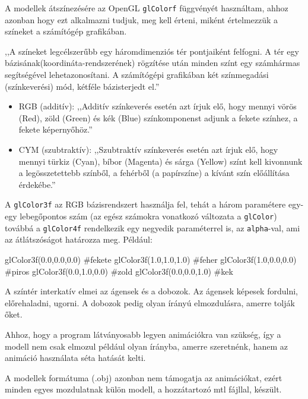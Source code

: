 
A modellek átszínezésére az OpenGL \texttt{glColorf} függvényét használtam, ahhoz azonban hogy ezt alkalmazni tudjuk, meg kell érteni, miként értelmezzük a színeket a számítógép grafikában.

,,A színeket legcélszerűbb egy háromdimenziós tér pontjaiként felfogni. A tér egy bázisának(koordináta-rendszerének) rögzítése után minden színt egy számhármas segítségével lehetazonosítani. A számítógépi grafikában két színmegadási (színkeverési) mód, kétféle bázisterjedt el.”
\begin{itemize}
\item  RGB (additív): ,,Additív színkeverés esetén azt írjuk elő, hogy mennyi vörös (Red), zöld (Green) és kék (Blue) színkomponenst adjunk a fekete színhez, a fekete képernyőhöz.”
\item CYM (szubtraktív): ,,Szubtraktív színkeverés esetén azt írjuk elő, hogy mennyi türkiz (Cyan), bíbor (Magenta) és sárga (Yellow) színt kell kivonnunk a legösszetettebb színből, a fehérből (a papírszíne) a kívánt szín előállítása érdekébe.”
\end{itemize}

A \texttt{glColor3f} az RGB bázisrendszert használja fel, tehát a három paramétere egy-egy lebegőpontos szám (az egész számokra vonatkozó változata a \texttt{glColor}) továbbá a \texttt{glColor4f} rendelkezik egy negyedik paraméterrel is, az \texttt{alpha}-val, ami az átlátszóságot határozza meg.
Például: 
\begin{python}
glColor3f(0.0,0.0,0.0) #fekete
glColor3f(1.0,1.0,1.0) #feher
glColor3f(1.0,0.0,0.0) #piros
glColor3f(0.0,1.0,0.0) #zold
glColor3f(0.0,0.0,1.0) #kek
\end{python}


A színtér interkatív elmei az ágensek és a dobozok. 
Az ágensek képesek fordulni, előrehaladni, ugorni. 
A dobozok pedig olyan írányú elmozdulásra, amerre tolják őket.


Ahhoz, hogy a program látványosabb legyen animációkra van szükség, így a modell nem csak elmozul például olyan írányba, amerre szeretnénk, hanem az animáció használata séta hatását kelti.

A modellek formátuma (.obj) azonban nem támogatja az animációkat, ezért minden egyes mozdulatnak külön modell, a hozzátartozó mtl fájllal, készült.

